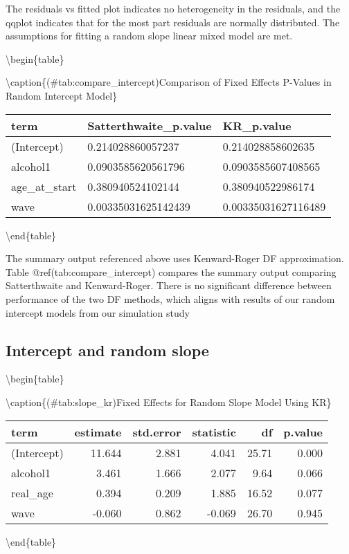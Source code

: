 \documentclass[12pt, twoside]{amherstthesis}
\begin{document}
The residuals vs fitted plot indicates no heterogeneity in the residuals, and the qqplot indicates that for the most part residuals are normally distributed. The assumptions for fitting a random slope linear mixed model are met.

\textbackslash begin\{table\}

\textbackslash caption\{(\#tab:compare\_intercept)Comparison of Fixed Effects P-Values in Random Intercept Model\}
\centering
\begin{tabular}[t]{l|l|l}
\hline
term & Satterthwaite\_p.value & KR\_p.value\\
\hline
(Intercept) & 0.214028860057237 & 0.214028858602635\\
\hline
alcohol1 & 0.0903585620561796 & 0.0903585607408565\\
\hline
age\_at\_start & 0.380940524102144 & 0.380940522986174\\
\hline
wave & 0.00335031625142439 & 0.00335031627116489\\
\hline
\end{tabular}
\textbackslash end\{table\}

The summary output referenced above uses Kenward-Roger DF approximation. Table @ref(tab:compare\_intercept) compares the summary output comparing Satterthwaite and Kenward-Roger. There is no significant difference between performance of the two DF methods, which aligns with results of our random intercept models from our simulation study

\hypertarget{intercept-and-random-slope}{%
\subsection{Intercept and random slope}\label{intercept-and-random-slope}}

\textbackslash begin\{table\}

\textbackslash caption\{(\#tab:slope\_kr)Fixed Effects for Random Slope Model Using KR\}
\centering
\begin{tabular}[t]{l|r|r|r|r|r}
\hline
term & estimate & std.error & statistic & df & p.value\\
\hline
(Intercept) & 11.644 & 2.881 & 4.041 & 25.71 & 0.000\\
\hline
alcohol1 & 3.461 & 1.666 & 2.077 & 9.64 & 0.066\\
\hline
real\_age & 0.394 & 0.209 & 1.885 & 16.52 & 0.077\\
\hline
wave & -0.060 & 0.862 & -0.069 & 26.70 & 0.945\\
\hline
\end{tabular}
\textbackslash end\{table\}
\end{document}
